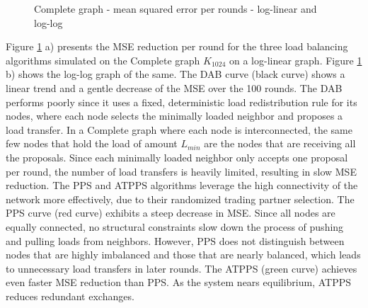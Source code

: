 \begin{figure}[!ht]
    \centering
    \hfil
    \caption{Complete graph - mean squared error per rounds - log-linear
    and log-log}
        \label{fig:completegraphMSEperRoundLogLog}
\end{figure}

Figure \ref{fig:completegraphMSEperRoundLogLog} a) presents the MSE reduction per round for the three load balancing algorithms simulated on the Complete graph $K_{1024}$ on a log-linear graph. Figure \ref{fig:completegraphMSEperRoundLogLog} b) shows the log-log graph of the same. The DAB curve (black curve) shows a linear trend and a gentle decrease of the MSE over the 100 rounds. The DAB performs poorly since it uses a fixed, deterministic load redistribution rule for its nodes, where each node selects the minimally loaded neighbor and proposes a load transfer. In a Complete graph where each node is interconnected, the same few nodes that hold the load of amount $L_{min}$ are the nodes that are receiving all the proposals. Since each minimally loaded neighbor only accepts one proposal per round, the number of load transfers is heavily limited, resulting in slow MSE reduction. The PPS and ATPPS algorithms leverage the high connectivity of the network more effectively, due to their randomized trading partner selection. The PPS curve (red curve) exhibits a steep decrease in MSE. Since all nodes are equally connected, no structural constraints slow down the process of pushing and pulling loads from neighbors. However, PPS does not distinguish between nodes that are highly imbalanced and those that are nearly balanced, which leads to unnecessary load transfers in later rounds. The ATPPS (green curve) achieves even faster MSE reduction than PPS. As the system nears equilibrium, ATPPS reduces redundant exchanges.

